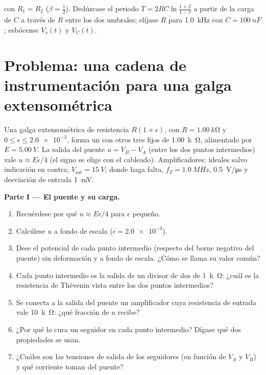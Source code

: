 \begin{exercise}[$\star\star\star$]\label{exo:b1:operational-amplifier:12}
 con $R_1 = R_2$ ($\beta = \tfrac12$). Dedúzcase el
periodo $T = 2RC\ln\frac{1 + \beta}{1 - \beta}$ a partir de la carga de
$C$ a través de $R$ entre los dos umbrales; elíjase $R$ para
\qty{1.0}{kHz} con $C = \qty{100}{nF}$; esbócense $V_s(t)$ y $V_C(t)$.
\end{exercise}

\section{Problema: una cadena de instrumentación para una galga extensométrica}

\begin{problem}
\label{pb:b1:operational-amplifier:1}
Una galga extensométrica de resistencia $R(1 + \epsilon)$, con
$R = \qty{1.00}{k\ohm}$ y $0 \leq \epsilon \leq \num{2.0e-3}$, forma un
 con otros tres  fijos de \qty{1.00}{k\ohm},
alimentado por $E = \qty{5.00}{V}$. La salida del puente $u = V_B - V_A$
(entre los dos puntos intermedios) vale $u \approx E\epsilon/4$ (el signo
se elige con el cableado). Amplificadores: ideales salvo indicación en
contra; $V_{\mathrm{sat}} = \qty{15}{V}$; donde haga falta,
$f_T = \qty{1.0}{MHz}$,  \qty{0.5}{V/\micro s} y
desviación de entrada \qty{1}{mV}.

\medskip
\noindent\textbf{Parte I --- El puente y su carga.}
\begin{enumerate}
  \item Recuérdese por qué $u \approx E\epsilon/4$ para $\epsilon$ pequeño.
  \item Calcúlese $u$ a fondo de escala ($\epsilon = \num{2.0e-3}$).
  \item Dese el potencial de cada punto intermedio (respecto del borne
        negativo del puente) sin deformación y a fondo de escala. ¿Cómo se
        llama su valor común?
  \item Cada punto intermedio es la salida de un divisor de dos
         de \qty{1}{k\ohm}: ¿cuál es la resistencia de Thévenin
        vista entre los dos puntos intermedios?
  \item Se conecta a la salida del puente un amplificador cuya resistencia
        de entrada vale \qty{10}{k\ohm}: ¿qué fracción de $u$ recibe?
  \item ¿Por qué lo cura un seguidor en cada punto intermedio? Dígase qué
        dos propiedades se usan.
  \item ¿Cuáles son las tensiones de salida de los seguidores (en función
        de $V_A$ y $V_B$) y qué corriente toman del puente?
\end{enumerate}


\end{problem}
